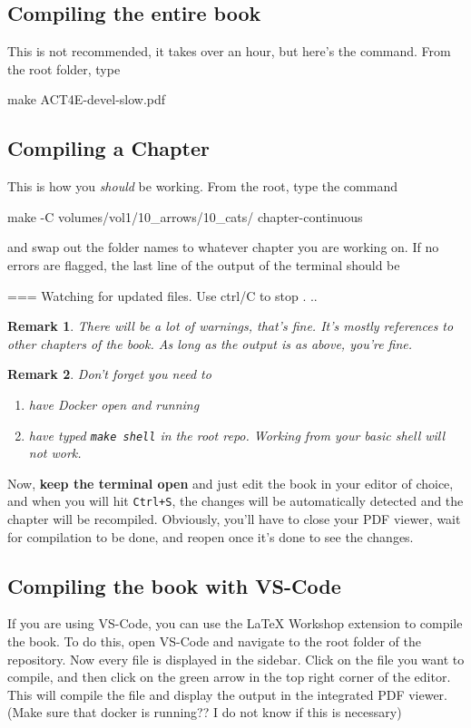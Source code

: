 \documentclass{article}
\newtheorem{remark}{Remark}
\begin{document}
    \subsection{Compiling the entire book}
    This is not recommended, it takes over an hour, but here's the command.
    From the root folder, type
    \begin{bashcode}
        make ACT4E-devel-slow.pdf
    \end{bashcode}
    \subsection{Compiling a Chapter}
    This is how you \textit{should} be working.
    From the root, type the command
    \begin{bashcode}
        make -C volumes/vol1/10_arrows/10_cats/ chapter-continuous
    \end{bashcode}
    and swap out the folder names to whatever chapter you are working on. If no errors are flagged, the last line of the output of the terminal should be
    \begin{bashcode}
        === Watching for updated files.
        Use ctrl/C to stop .
        ..
    \end{bashcode}
    \begin{remark}
        There will be a lot of warnings, that's fine.
        It's mostly references to other chapters of the book.
        As long as the output is as above, you're fine.
    \end{remark}
    \begin{remark}
        Don't forget you need to
        \begin{enumerate}
            \item have Docker open and running
            \item have typed \texttt{make shell} in the root repo.
                  Working from your basic shell will not work.
        \end{enumerate}
    \end{remark}
    Now, \textbf{keep the terminal open} and just edit the book in your editor of choice, and when you will hit \texttt{Ctrl+S}, the changes will be automatically detected and the chapter will be recompiled.
    Obviously, you'll have to close your PDF viewer, wait for compilation to be done, and reopen once it's done to see the changes.

    \subsection{Compiling the book with VS-Code}
    If you are using VS-Code, you can use the LaTeX Workshop extension to compile the book.
    To do this, open VS-Code and navigate to the root folder of the repository.
    Now every file is displayed in the sidebar.
    Click on the file you want to compile, and then click on the green arrow in the top right corner of the editor.
    This will compile the file and display the output in the integrated PDF viewer.
    (Make sure that docker is running?? I do not know if this is necessary)
\end{document}

